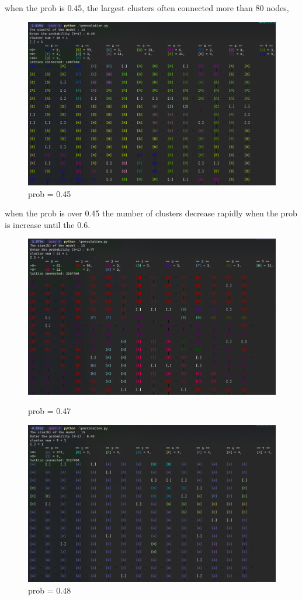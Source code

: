 \documentclass{article}
\begin{document}
when the prob is 0.45, the largest clusters often connected more than 80 nodes, 

\begin{figure}[h]
\centering
\includegraphics[width=0.465\linewidth]{percolation result with size = 15/size_15_prob_0.45.png}
\caption{\label{fig:DFS}prob = 0.45}
\end{figure}

\newpage

when the prob is over 0.45 the number of clusters decrease rapidly when the prob is increase until the 0.6.

\begin{figure}[h]
   \begin{minipage}{0.48\textwidth}
     \centering
     \includegraphics[width=1\linewidth]{percolation result with size = 15/size_15_prob_0.47.png}
     \caption{prob = 0.47}\label{prob = 0.47}
   \end{minipage}\hfill
   \begin{minipage}{0.48\textwidth}
     \centering
     \includegraphics[width=1\linewidth]{percolation result with size = 15/size_15_prob_0.48.png}
     \caption{prob = 0.48}\label{prob = 0.48}
   \end{minipage}
\end{figure}
\end{document}
